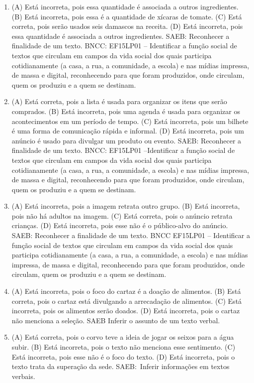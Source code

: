 \begin{enumerate}
\item
(A) Está incorreta, pois essa quantidade é associada a outros ingredientes.
(B) Está incorreta, pois essa é a quantidade de xícaras de tomate.
(C) Está correta, pois serão usados seis damascos na receita.
(D) Está incorreta, pois essa quantidade é associada a outros ingredientes.
SAEB: Reconhecer a finalidade de um texto.
BNCC: EF15LP01 -- Identificar a função social de textos que
circulam em campos da vida social dos quais participa cotidianamente (a
casa, a rua, a comunidade, a escola) e nas mídias impressa, de massa e
digital, reconhecendo para que foram produzidos, onde circulam, quem os
produziu e a quem se destinam.

\item
(A) Está correta, pois a lista é usada para organizar os itens que serão comprados.
(B) Está incorreta, pois uma agenda é usada para organizar os acontecimentos em um período de tempo.
(C) Está incorreta, pois um bilhete é uma forma de comunicação rápida e informal.
(D) Está incorreta, pois um anúncio é usado para divulgar um produto ou evento.
SAEB: Reconhecer a finalidade de um texto.
BNCC: EF15LP01 --Identificar a função social de textos que
circulam em campos da vida social dos quais participa cotidianamente (a
casa, a rua, a comunidade, a escola) e nas mídias impressa, de massa e
digital, reconhecendo para que foram produzidos, onde circulam, quem os
produziu e a quem se destinam.

\item
(A) Está incorreta, pois a imagem retrata outro grupo.
(B) Está incorreta, pois não há adultos na imagem.
(C) Está correta, pois o anúncio retrata crianças.
(D) Está incorreta, pois esse não é o público-alvo do anúncio.
SAEB: Reconhecer a finalidade de um texto.
BNCC EF15LP01 -- Identificar a função social de textos que circulam em
campos da vida social dos quais participa cotidianamente (a casa, a rua,
a comunidade, a escola) e nas mídias impressa, de massa e digital,
reconhecendo para que foram produzidos, onde circulam, quem os produziu
e a quem se destinam.

\item
(A) Está incorreta, pois o foco do cartaz é a doação de alimentos.
(B) Está correta, pois o cartaz está divulgando a arrecadação de alimentos.
(C) Está incorreta, pois os alimentos serão doados.
(D) Está incorreta, pois o cartaz não menciona a seleção.
SAEB Inferir o assunto de um texto verbal.

\item
(A) Está correta, pois o corvo teve a ideia de jogar os seixos para a água subir.
(B) Está incorreta, pois o texto não menciona esse sentimento.
(C) Está incorreta, pois esse não é o foco do texto.
(D) Está incorreta, pois o texto trata da superação da sede.
SAEB:~Inferir informações em textos verbais.


\end{enumerate}
